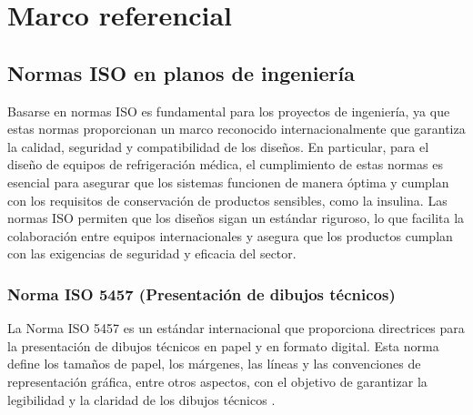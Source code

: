\section{Marco referencial}\rspitems
\subsection{Normas ISO en planos de ingeniería}
Basarse en normas ISO es fundamental para los proyectos de ingeniería, ya que estas normas proporcionan un marco reconocido internacionalmente que garantiza la calidad, seguridad y compatibilidad de los diseños. En particular, para el diseño de equipos de refrigeración médica, el cumplimiento de estas normas es esencial para asegurar que los sistemas funcionen de manera óptima y cumplan con los requisitos de conservación de productos sensibles, como la insulina. Las normas ISO permiten que los diseños sigan un estándar riguroso, lo que facilita la colaboración entre equipos internacionales y asegura que los productos cumplan con las exigencias de seguridad y eficacia del sector.\rspitems
\subsubsection{Norma ISO 5457 (Presentación de dibujos técnicos) }\rspitems
La Norma ISO 5457 es un estándar internacional que proporciona directrices para la presentación de dibujos técnicos en papel y en formato digital. Esta norma define los tamaños de papel, los márgenes, las líneas y las convenciones de representación gráfica, entre otros aspectos, con el objetivo de garantizar la legibilidad y la claridad de los dibujos técnicos \cite{manzanelli-2023}.\rspitems
